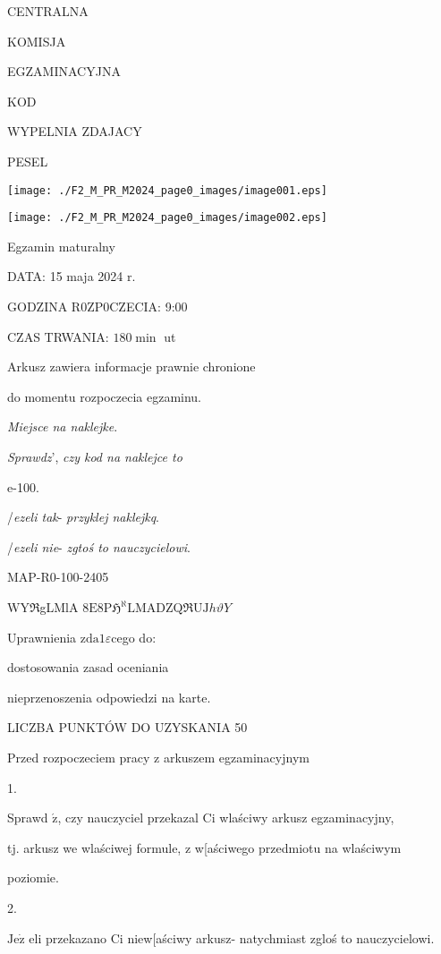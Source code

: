 \documentclass[a4paper,12pt]{article}
\begin{document}
CENTRALNA

KOMISJA

EGZAMINACYJNA

KOD

WYPELNIA ZDAJACY

PESEL
\begin{center}
\texttt{[image: ./F2\_M\_PR\_M2024\_page0\_images/image001.eps]}

\texttt{[image: ./F2\_M\_PR\_M2024\_page0\_images/image002.eps]}
\end{center}
Egzamin maturalny

DATA: 15 maja 2024 r.

GODZINA R0ZP0CZECIA: 9:00

CZAS TRWANIA: $180 \displaystyle \min$ ut

Arkusz zawiera informacje prawnie chronione

do momentu rozpoczecia egzaminu.

{\it Miejsce na naklejke}.

{\it Sprawdz}', {\it czy kod na naklejce to}

e-100.

/{\it ezeli tak}- {\it przyklej naklejkq}.

/{\it ezeli nie}- {\it zgtoś to nauczycielowi}.

MAP-R0-100-2405

$\mathrm{W}\mathrm{Y}\Re$gLMlA 8$\mathrm{E}8\mathrm{P}\mathfrak{H}^{\aleph}\mathrm{L}\mathrm{M}\mathrm{A}\mathrm{D}\mathrm{Z}\mathrm{Q}\Re \mathrm{U}\mathrm{J}h\vartheta Y$

Uprawnienia $\mathrm{z}\mathrm{d}\mathrm{a}1\varepsilon$cego do:

\fbox{} dostosowania zasad oceniania

\fbox{} nieprzenoszenia odpowiedzi na karte.

LICZBA PUNKTÓW DO UZYSKANIA 50

Przed rozpoczeciem pracy z arkuszem egzaminacyjnym

1.

Sprawd $\acute{\mathrm{z}}$, czy nauczyciel przekazal Ci wlaściwy arkusz egzaminacyjny,

tj. arkusz we wlaściwej formule, z w[aściwego przedmiotu na wlaściwym

poziomie.

2.

$\mathrm{J}\mathrm{e}\dot{\mathrm{z}}$ eli przekazano Ci niew[aściwy arkusz- natychmiast zgloś to nauczycielowi.
\end{document}

